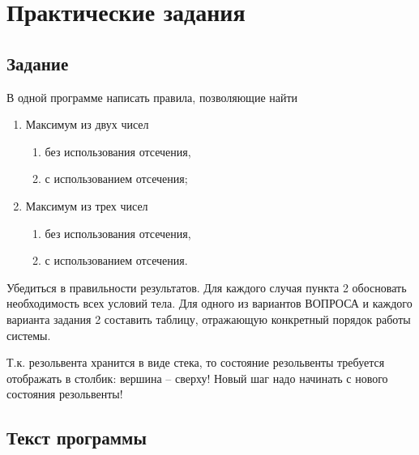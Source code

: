 \chapter{Практические задания}

\section{Задание}

В одной программе написать правила, позволяющие найти
\begin{enumerate}[label=\arabic*)]
    \item Максимум из двух чисел
        \begin{enumerate}[label=\alph*)]
            \item без использования отсечения,
            \item с использованием отсечения;
        \end{enumerate}
    \item Максимум из трех чисел
        \begin{enumerate}[label=\alph*)]
            \item без использования отсечения,
            \item с использованием отсечения.
        \end{enumerate}
\end{enumerate}

Убедиться в правильности результатов.  Для каждого случая пункта 2 обосновать
необходимость всех условий тела. Для одного из вариантов ВОПРОСА и каждого
варианта задания 2 составить таблицу, отражающую конкретный порядок работы
системы. 

Т.к. резольвента хранится в виде стека, то состояние резольвенты
требуется отображать в столбик: вершина – сверху! Новый шаг надо начинать с
нового состояния резольвенты!

\section{Текст программы}


